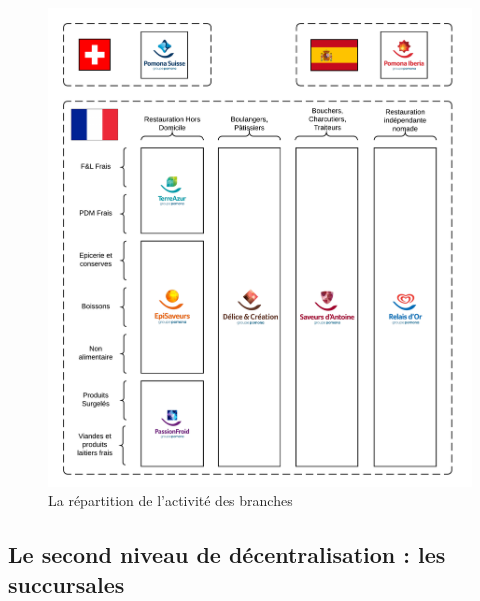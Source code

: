                 \begin{figure}[htpb]
                    \begin{center}
                    \includegraphics[width=\linewidth]{img/La repartition de lactivite des branches.png}
                    \end{center}
                    \caption{La répartition de l'activité des branches}
                    \label{fig:repartition_activite}
                \end{figure}

            \subsection{Le second niveau de décentralisation : les succursales}

